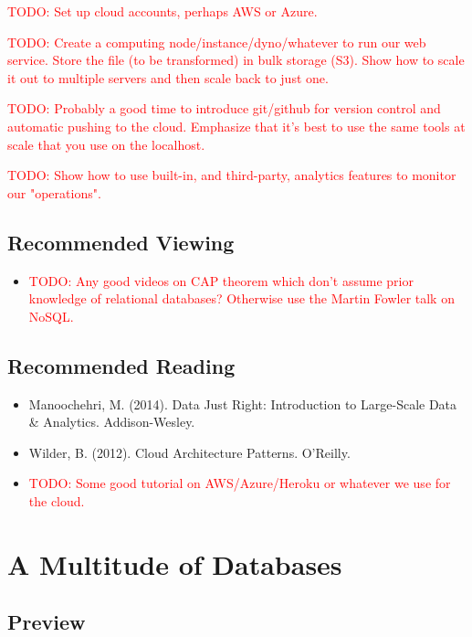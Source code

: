 \documentclass[11pt]{book}
\newcommand{\todo}[1]{\textcolor{red}{TODO: #1}} %
\begin{document}
\todo{Set up cloud accounts, perhaps AWS or Azure.}

\todo{Create a computing node/instance/dyno/whatever to run our web service.  Store the file (to be transformed) in bulk storage (S3).  Show how to scale it out to multiple servers and then scale back to just one.} 

\todo{Probably a good time to introduce git/github for version control and automatic pushing to the cloud.  Emphasize that it's best to use the same tools at scale that you use on the localhost.}

\todo{Show how to use built-in, and third-party, analytics features to monitor our "operations".}

\section*{Recommended Viewing}
\begin{itemize}
    \item \todo{Any good videos on CAP theorem which don't assume prior knowledge of relational databases?  Otherwise use the Martin Fowler talk on NoSQL.}
\end{itemize}

\section*{Recommended Reading}
\begin{itemize}
    \item Manoochehri, M. (2014). Data Just Right: Introduction to Large-Scale Data \& Analytics. Addison-Wesley.
    \item Wilder, B. (2012). Cloud Architecture Patterns. O'Reilly.
    \item \todo{Some good tutorial on AWS/Azure/Heroku or whatever we use for the cloud.}
\end{itemize}









\chapter{A Multitude of Databases}\label{ch:nosql}

\section*{Preview}
\end{document}

